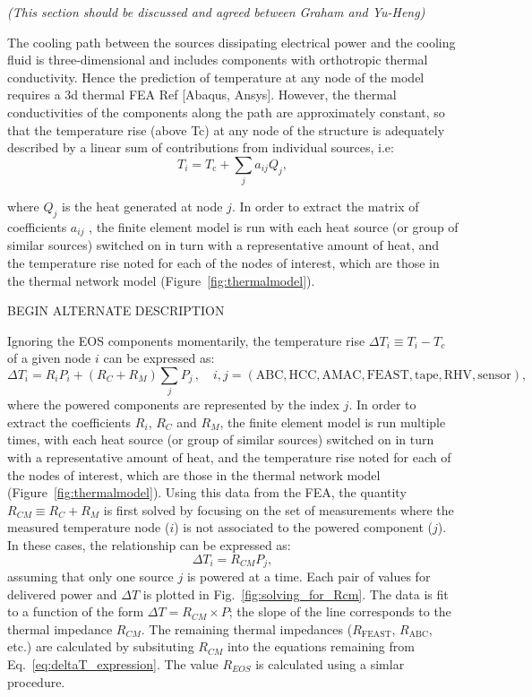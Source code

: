\textit{(This section should be discussed and agreed between Graham and Yu-Heng)}

The cooling path between the sources dissipating electrical power and the cooling fluid is three-dimensional and includes components with orthotropic thermal conductivity. Hence the prediction of temperature at any node of the model requires a 3d thermal FEA Ref [Abaqus, Ansys]. However, the thermal conductivities of the components along the path are approximately constant, so that the temperature rise (above Tc) at any node of the structure is adequately described by a linear sum of contributions from individual sources, i.e:
\begin{equation}
T_i  =   T_\text{c}  +  \sum_{j} a_{ij} Q_{j},
\end{equation}

where $Q_j$ is the heat generated at node $j$. In order to extract the matrix of coefficients $a_{ij}$ , the finite element model is run with each heat source (or group of similar sources) switched on in turn with a representative amount of heat, and the temperature rise noted for each of the nodes of interest, which are those in the thermal network model (Figure~\ref{fig:thermalmodel}).  

BEGIN ALTERNATE DESCRIPTION


Ignoring the EOS components momentarily, the temperature rise $\Delta T_i \equiv T_i - T_c$ of a given node $i$ can be expressed as:
\begin{equation}
\Delta T_i = R_i P_i + \left(R_{C} + R_{M}\right)\sum_j P_j\,, \quad i,j=(\text{ABC},\text{HCC},\text{AMAC},\text{FEAST},\text{tape},\text{RHV},\text{sensor}),
\label{eq:deltaT_expression}
\end{equation}
where the powered components are represented by the index $j$.
In order to extract the coefficients $R_{i}$, $R_{C}$ and $R_{M}$,
the finite element model is run multiple times, with each heat source (or group of similar sources)
switched on in turn with a representative amount of heat, and the temperature rise
noted for each of the nodes of interest, which are those in the thermal network model (Figure~\ref{fig:thermalmodel}).
%
Using this data from the FEA, the quantity $R_{CM}\equiv R_{C} + R_{M}$ is first solved by
focusing on the set of measurements where the measured temperature node ($i$)
is not associated to the powered component ($j$).
In these cases, the relationship can be expressed as:
\begin{equation}
\Delta T_i = R_{CM} P_j,
\end{equation}
assuming that only one source $j$ is powered at a time.
Each pair of values for delivered power and $\Delta T$ is plotted in Fig.~\ref{fig:solving_for_Rcm}.
The data is fit to a function of the form $\Delta T = R_{CM} \times P$;
the slope of the line corresponds to the thermal impedance $R_{CM}$.
The remaining thermal impedances ($R_\text{FEAST}$, $R_\text{ABC}$, etc.) are calculated by
subsituting $R_{CM}$ into the equations remaining from Eq.~\ref{eq:deltaT_expression}.
The value $R_{EOS}$ is calculated using a simlar procedure.

